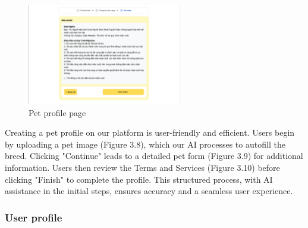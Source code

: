 \begin {figure}[H]
\centering
\includegraphics[width=0.6\textwidth]{Figures/UI/term_ui.png}
\caption{Pet profile page}
\end{figure}

Creating a pet profile on our platform is user-friendly and efficient. Users begin by uploading a pet image (Figure 3.8), which our AI processes to autofill the breed. Clicking "Continue" leads to a detailed pet form (Figure 3.9) for additional information. Users then review the Terms and Services (Figure 3.10) before clicking "Finish" to complete the profile. This structured process, with AI assistance in the initial steps, ensures accuracy and a seamless user experience.

\subsubsection{User profile}

